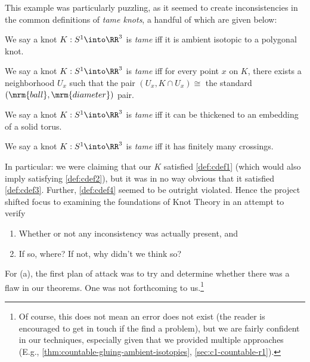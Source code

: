 



This example was particularly puzzling, as it seemed to create
inconsistencies in the common definitions of \emph{tame knots}, a
handful of which are given below:
\begin{commondef}\label{def:cdef1}
  We say a knot $K : S^1 \into \RR^3$ is \emph{tame} iff it is ambient
  isotopic to a polygonal knot.
\end{commondef}
\begin{commondef}\label{def:cdef2}
  We say a knot $K : S^1 \into \RR^3$ is \emph{tame} iff for every
  point $x$ on $K$, there exists a neighborhood $U_x$ such that the
  pair $(U_x, K \cap U_x) \cong $ the standard $(\mrm{ball},
  \mrm{diameter})$ pair.
\end{commondef}
\begin{commondef}\label{def:cdef3}
  We say a knot $K : S^1 \into \RR^3$ is \emph{tame} iff it can be
  thickened to an embedding of a solid torus.
\end{commondef}
\begin{commondef}\label{def:cdef4}
  We say a knot $K : S^1 \into \RR^3$ is \emph{tame} iff it has
  finitely many crossings.
\end{commondef}
In particular: we were claiming that our $K$ satisfied
\cref{def:cdef1} (which would also imply satisfying \cref{def:cdef2}),
but it was in no way obvious that it satisfied \cref{def:cdef3}.
Further, \cref{def:cdef4} seemed to be outright violated. Hence the
project shifted focus to examining the foundations of Knot Theory in
an attempt to verify
\begin{enumerate}
  \item Whether or not any inconsistency was actually present, and
  \item If so, where? If not, why didn't we think so?
\end{enumerate}
For (a), the first plan of attack was to try and determine whether
there was a flaw in our theorems. One was not forthcoming to
us.\footnote{Of course, this does not mean an error does not exist
  (the reader is encouraged to get in touch if the find a problem),
  but we are fairly confident in our techniques, especially given that
  we provided multiple approaches (E.g.,
  \cref{thm:countable-gluing-ambient-isotopies},
  \cref{sec:c1-countable-r1}).}

